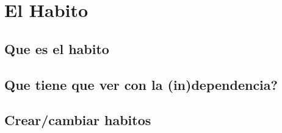 \chapter{El Habito}
\section{ Que es el habito }
\section{ Que tiene que ver con la (in)dependencia?}
\section{ Crear/cambiar habitos}

